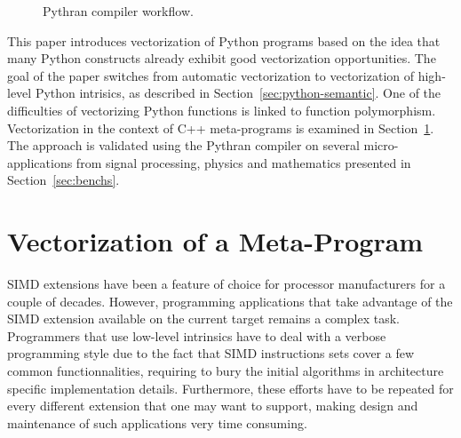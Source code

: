 \documentclass[preprint]{sigplanconf}
\begin{document}
\begin{figure}

\centering
{}

\caption{Pythran compiler workflow.}
\label{fig:pythran-compiler}
\end{figure}


This paper introduces vectorization of Python programs based on the idea that
many Python constructs already exhibit good vectorization opportunities. The
goal of the paper switches from automatic vectorization to vectorization of
high-level Python intrisics, as described in Section~\ref{sec:python-semantic}.
One of the difficulties of vectorizing Python functions is linked to function
polymorphism. Vectorization in the context of C++ meta-programs is examined in
Section~\ref{sec:meta-vectorization}. The approach is validated using the
Pythran compiler on several micro-applications from signal processing, physics
and mathematics presented in Section~\ref{sec:benchs}.

\section{Vectorization of a Meta-Program}
\label{sec:meta-vectorization}
SIMD extensions have been a feature of choice for processor manufacturers for a
couple of decades. However, programming applications that take advantage of the 
SIMD extension available on the current target remains a complex task. Programmers 
that use low-level intrinsics have to deal with a verbose programming style due 
to the fact that SIMD instructions sets cover a few common functionnalities, requiring
to bury the initial algorithms in architecture specific implementation details.
Furthermore, these efforts have to be repeated for every different extension
that one may want to support, making design and maintenance of such applications 
very time consuming. 
\end{document}
